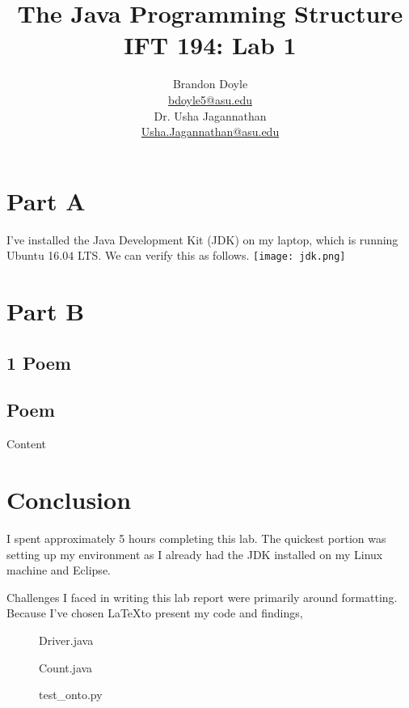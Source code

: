 \documentclass[leqno, 11pt]{article}
\title{\vspace{6ex}The Java Programming Structure\\
  \Large IFT 194: Lab 1}
\author{Brandon Doyle\\
\href{mailto:bdoyle@asu.edu}{bdoyle5\mbox{}{\fontfamily{ptm}\selectfont @}\mbox{}asu.edu}\\[1em]
Dr. Usha Jagannathan\\
\href{mailto:Usha.Jagannathan@asu.edu}{Usha.Jagannathan\mbox{}{\fontfamily{ptm}\selectfont @}\mbox{}asu.edu}}
\begin{document}
\begin{titlepage}
\clearpage\maketitle
\thispagestyle{empty}
\end{titlepage}

\section*{Part A}
I've installed the Java Development Kit (JDK) on my laptop, which is running
Ubuntu 16.04 LTS. We can verify this as follows.
\texttt{[image: jdk.png]}
\section*{Part B}
\subsection*{1 Poem}
\setcounter{subsection}{1}
\subsection{Poem}
Content
\section*{Conclusion}
I spent approximately 5 hours completing this lab. The quickest portion was
setting up my environment as I already had the JDK installed on my Linux 
machine and Eclipse.

Challenges I faced in writing this lab report were primarily around formatting.
Because I've chosen \LaTeX to present my code and findings, 
\newpage
\begin{figure}[t!]
  \centering
  
  \caption{Driver.java}
  \label{fig:one}
\end{figure}

\begin{figure}
  \centering
  
  \caption{Count.java}
  \label{fig:two}
\end{figure}

\begin{figure}
  \centering
  
  \caption{test\_onto.py}
  \label{fig:three}
\end{figure}
\end{document}
